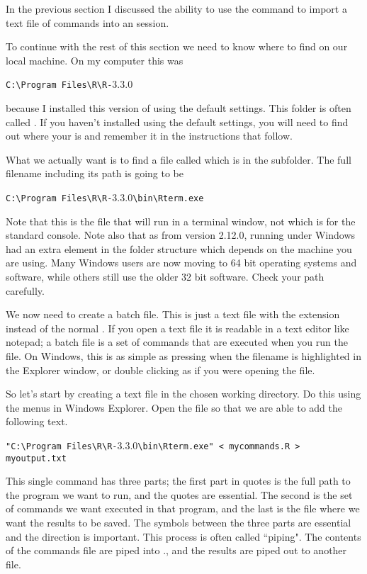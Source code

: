 In the previous section I discussed the ability to use the  command to import a text file of commands into an \R{} session. 
 
To continue with the rest of this section we need to know where to find \R{} on our local machine. On my computer this was \begin{center} \verb+C:\Program Files\R\R-+3.3.0 
\end{center} 
 because I installed this version of \R{} using the default settings. This folder is often called \RHome{}. If you haven't installed \R{} using the default settings, you will need to find out where your \RHome{} is and remember it in the instructions that follow. 
 
What we actually want is to find a file called  which is in the  subfolder. The full filename including its path is going to be \begin{center}\verb+C:\Program Files\R\R-+3.3.0\verb+\bin\Rterm.exe+\end{center} Note that this is the file that will run \R{} in a terminal window, not  which is for the standard \R{} console. Note also that as from version 2.12.0, \R{} running under Windows had an extra element in the folder structure which depends on the machine you are using. Many Windows users are now moving to 64 bit operating systems and software, while others still use the older 32 bit software. Check your path carefully. 
 
We now need to create a batch file. This is just a text file with the extension  instead of the normal . If you open a text file it is readable in a text editor like notepad; a batch file is a set of commands that are executed when you run the file. On Windows, this is as simple as pressing  when the filename is highlighted in the Explorer window, or double clicking as if you were opening the file. 
 
So let's start by creating a text file in the chosen working directory. Do this using the menus in Windows Explorer. Open the file so that we are able to add the following text.  
\begin{center} 
\verb+"C:\Program Files\R\R-+3.3.0\verb+\bin\Rterm.exe" < mycommands.R > myoutput.txt+ 
\end{center} 
 
This single command has three parts; the first part in quotes is the full path to the program we want to run, and the quotes are essential. The second is the set of commands we want executed in that program, and the last is the file where we want the results to be saved. The symbols between the three parts are essential and the direction is important. This process is often called ``piping". The contents of the commands file are piped into \R{}., and the results are piped out to another file. 
 

